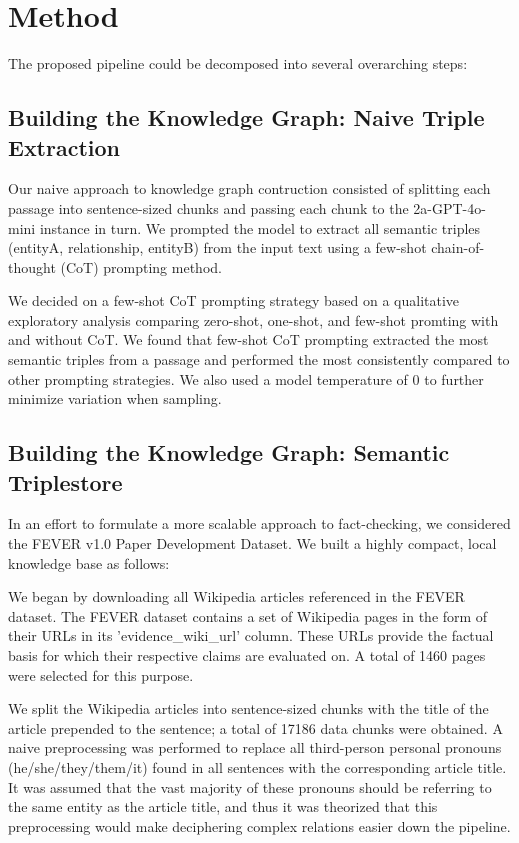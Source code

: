 \documentclass[11pt]{article}
\begin{document}
\section{Method}
The proposed pipeline could be decomposed into several overarching steps:

\subsection{Building the Knowledge Graph: Naive Triple Extraction}
Our naive approach to knowledge graph contruction consisted of splitting each passage into sentence-sized chunks and passing each chunk to the 2a-GPT-4o-mini instance in turn. We prompted the model to extract all semantic triples (entityA, relationship, entityB) from the input text using a few-shot chain-of-thought (CoT) prompting method.

We decided on a few-shot CoT prompting strategy based on a qualitative exploratory analysis comparing zero-shot, one-shot, and few-shot promting with and without CoT. We found that few-shot CoT prompting extracted the most semantic triples from a passage and performed the most consistently compared to other prompting strategies. We also used a model temperature of $0$ to further minimize variation when sampling.

\subsection{Building the Knowledge Graph: Semantic Triplestore}
In an effort to formulate a more scalable approach to fact-checking, we considered the FEVER v1.0 Paper Development Dataset\cite{fever}. We built a highly compact, local knowledge base as follows:

We began by downloading all Wikipedia articles referenced in the FEVER dataset. The FEVER dataset contains a set of Wikipedia pages in the form of their URLs in its 'evidence\_wiki\_url' column. These URLs provide the factual basis for which their respective claims are evaluated on. A total of 1460 pages were selected for this purpose.

We split the Wikipedia articles into sentence-sized chunks with the title of the article prepended to the sentence; a total of 17186 data chunks were obtained. A naive preprocessing was performed to replace all third-person personal pronouns (he/she/they/them/it) found in all sentences with the corresponding article title. It was assumed that the vast majority of these pronouns should be referring to the same entity as the article title, and thus it was theorized that this preprocessing would make deciphering complex relations easier down the pipeline.
\end{document}
